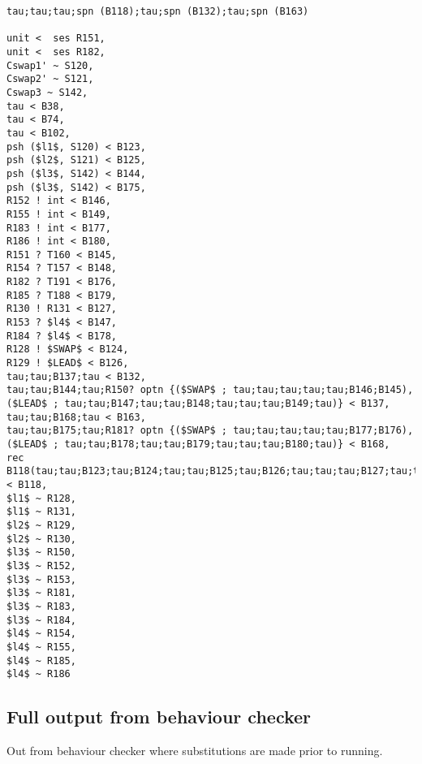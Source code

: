 \begin{lstlisting}
tau;tau;tau;spn (B118);tau;spn (B132);tau;spn (B163)

unit <  ses R151,
unit <  ses R182,
Cswap1' ~ S120,
Cswap2' ~ S121,
Cswap3 ~ S142,
tau < B38,
tau < B74,
tau < B102,
psh ($l1$, S120) < B123,
psh ($l2$, S121) < B125,
psh ($l3$, S142) < B144,
psh ($l3$, S142) < B175,
R152 ! int < B146,
R155 ! int < B149,
R183 ! int < B177,
R186 ! int < B180,
R151 ? T160 < B145,
R154 ? T157 < B148,
R182 ? T191 < B176,
R185 ? T188 < B179,
R130 ! R131 < B127,
R153 ? $l4$ < B147,
R184 ? $l4$ < B178,
R128 ! $SWAP$ < B124,
R129 ! $LEAD$ < B126,
tau;tau;B137;tau < B132,
tau;tau;B144;tau;R150? optn {($SWAP$ ; tau;tau;tau;tau;tau;B146;B145), ($LEAD$ ; tau;tau;B147;tau;tau;B148;tau;tau;tau;B149;tau)} < B137,
tau;tau;B168;tau < B163,
tau;tau;B175;tau;R181? optn {($SWAP$ ; tau;tau;tau;tau;tau;B177;B176), ($LEAD$ ; tau;tau;B178;tau;tau;B179;tau;tau;tau;B180;tau)} < B168,
rec B118(tau;tau;B123;tau;B124;tau;tau;B125;tau;B126;tau;tau;tau;B127;tau;tau;B118) < B118,
$l1$ ~ R128,
$l1$ ~ R131,
$l2$ ~ R129,
$l2$ ~ R130,
$l3$ ~ R150,
$l3$ ~ R152,
$l3$ ~ R153,
$l3$ ~ R181,
$l3$ ~ R183,
$l3$ ~ R184,
$l4$ ~ R154,
$l4$ ~ R155,
$l4$ ~ R185,
$l4$ ~ R186
\end{lstlisting}

\subsection*{Full output from behaviour checker}
Out from behaviour checker where substitutions are made prior to running.

